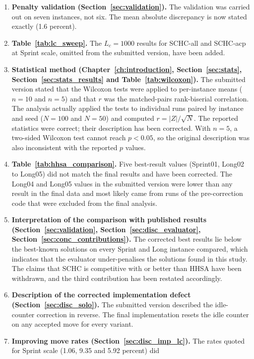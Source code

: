 \documentclass[12pt, a4paper, oneside]{report}
\begin{document}
\begin{enumerate}
\item \textbf{Penalty validation (Section~\ref{sec:validation}).}
The validation was carried out on seven instances, not six. The
mean absolute discrepancy is now stated exactly (1.6 percent).
\item \textbf{Table~\ref{tab:lc_sweep}.} The $L_c = 1000$ results for
SCHC-all and SCHC-acp at Sprint scale, omitted from the submitted
version, have been added.
\item \textbf{Statistical method (Chapter~\ref{ch:introduction},
Section~\ref{sec:stats}, Section~\ref{sec:stats_results} and
Table~\ref{tab:wilcoxon}).} The submitted version stated that the Wilcoxon tests
were applied to per-instance means ($n = 10$ and $n = 5$) and that
$r$ was the matched-pairs rank-biserial correlation. The analysis
actually applied the tests to individual runs paired by instance and
seed ($N = 100$ and $N = 50$) and computed $r = |Z|/\sqrt{N}$. The
reported statistics were correct; their description has been
corrected. With $n = 5$, a two-sided Wilcoxon test cannot reach
$p < 0.05$, so the original description was also inconsistent with
the reported $p$ values.
\item \textbf{Table~\ref{tab:hhsa_comparison}.} Five best-result
values (Sprint01, Long02 to Long05) did not match the final results
and have been corrected. The Long04 and Long05 values in the
submitted version were lower than any result in the final data and
most likely came from runs of the pre-correction code that were
excluded from the final analysis.
\item \textbf{Interpretation of the comparison with published results
(Section~\ref{sec:validation}, Section~\ref{sec:disc_evaluator},
Section~\ref{sec:conc_contributions}).} The corrected best results
lie below the best-known solutions on every Sprint and Long instance
compared, which indicates that the evaluator under-penalises the
solutions found in this study. The claims that SCHC is competitive
with or better than HHSA have been withdrawn, and the third
contribution has been restated accordingly.
\item \textbf{Description of the corrected implementation defect
(Section~\ref{sec:disc_solo}).} The submitted version described the
idle-counter correction in reverse. The final implementation resets
the idle counter on any accepted move for every variant.
\item \textbf{Improving move rates (Section~\ref{sec:disc_imp_lc}).}
The rates quoted for Sprint scale (1.06, 9.35 and 5.92 percent) did

\end{enumerate}
\end{document}
